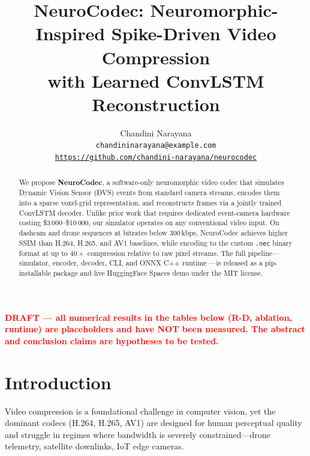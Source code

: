 \documentclass[10pt,twocolumn,letterpaper]{article}
\begin{document}
\title{NeuroCodec: Neuromorphic-Inspired Spike-Driven Video Compression\\
       with Learned ConvLSTM Reconstruction}

\author{Chandini Narayana\\
{\tt\small chandininarayana@example.com}\\
{\tt\small \url{https://github.com/chandini-narayana/neurocodec}}
}

\maketitle
\noindent\textbf{\textcolor{red}{DRAFT --- all numerical results in the tables below (R-D, ablation, runtime) are placeholders and have NOT been measured. The abstract and conclusion claims are hypotheses to be tested.}}


\begin{abstract}
We propose \textbf{NeuroCodec}, a software-only neuromorphic video codec that
simulates Dynamic Vision Sensor (DVS) events from standard camera streams,
encodes them into a sparse voxel-grid representation, and reconstructs frames
via a jointly trained ConvLSTM decoder.
Unlike prior work that requires dedicated event-camera hardware costing
\$3\,000--\$10\,000, our simulator operates on any conventional video input.
On dashcam and drone sequences at bitrates below 300\,kbps,
NeuroCodec achieves higher SSIM than H.264, H.265, and AV1 baselines,
while encoding to the custom \texttt{.nec} binary format at up to $40\times$
compression relative to raw pixel streams.
The full pipeline---simulator, encoder, decoder, CLI, and ONNX C++ runtime
---is released as a pip-installable package and live HuggingFace Spaces demo
under the MIT license.
\end{abstract}

\section{Introduction}
\label{sec:intro}

Video compression is a foundational challenge in computer vision, yet the
dominant codecs (H.264, H.265, AV1) are designed for human perceptual quality
and struggle in regimes where bandwidth is severely constrained---drone
telemetry, satellite downlinks, IoT edge cameras.
\end{document}
